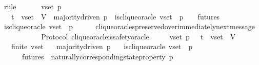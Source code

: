 \begin{isabellebody}
\ {\isacharparenleft}rule{\isacharplus}{\isacharparenright}\isanewline
{}\isamarkupfalse%
\ {\isacharminus}\isanewline
\ \ \isamarkupfalse%
\ {\isasymsigma}\ v{\isacharunderscore}set\ p\ {\isasymsigma}{\isacharprime}\isanewline
\ \ \isamarkupfalse%
\ {\isachardoublequoteopen}{\isasymsigma}\ {\isasymin}\ {\isasymSigma}t\ {\isasymand}\ v{\isacharunderscore}set\ {\isasymsubseteq}\ V{\isachardoublequoteclose}\ \ {\isachardoublequoteopen}majority{\isacharunderscore}driven\ p{\isachardoublequoteclose}\ \ {\isachardoublequoteopen}is{\isacharunderscore}clique{\isacharunderscore}oracle\ {\isacharparenleft}v{\isacharunderscore}set{\isacharcomma}\ {\isasymsigma}{\isacharcomma}\ p{\isacharparenright}{\isachardoublequoteclose}\ \ {\isachardoublequoteopen}{\isasymsigma}{\isacharprime}\ {\isasymin}\ futures\ {\isasymsigma}{\isachardoublequoteclose}\ \isanewline
\ \ \isamarkupfalse%
\ {\isachardoublequoteopen}is{\isacharunderscore}clique{\isacharunderscore}oracle\ {\isacharparenleft}v{\isacharunderscore}set{\isacharcomma}\ {\isasymsigma}{\isacharprime}{\isacharcomma}\ p{\isacharparenright}{\isachardoublequoteclose}\isanewline
\ \ \ \ \isamarkupfalse%
\ clique{\isacharunderscore}oracles{\isacharunderscore}preserved{\isacharunderscore}over{\isacharunderscore}immediately{\isacharunderscore}next{\isacharunderscore}message\isanewline
\ \ \ \ \isanewline
\ \ \ \ \isamarkupfalse%
\isanewline
{}\isamarkupfalse%
%
\endisatagproof
{\isafoldproof}%
%
\isadelimproof
\isanewline
%
\endisadelimproof
\isanewline
\isanewline
{}\isamarkupfalse%
\ {\isacharparenleft}\ Protocol{\isacharparenright}\ clique{\isacharunderscore}oracle{\isacharunderscore}is{\isacharunderscore}safety{\isacharunderscore}oracle\ {\isacharcolon}\isanewline
\ \ {\isachardoublequoteopen}{\isasymforall}\ {\isasymsigma}\ v{\isacharunderscore}set\ p{\isachardot}\ {\isasymsigma}\ {\isasymin}\ {\isasymSigma}t\ {\isasymand}\ v{\isacharunderscore}set\ {\isasymsubseteq}\ V\ \isanewline
\ \ {\isasymlongrightarrow}\ finite\ v{\isacharunderscore}set\isanewline
\ \ {\isasymlongrightarrow}\ majority{\isacharunderscore}driven\ p\isanewline
\ \ {\isasymlongrightarrow}\ is{\isacharunderscore}clique{\isacharunderscore}oracle\ {\isacharparenleft}v{\isacharunderscore}set{\isacharcomma}\ {\isasymsigma}{\isacharcomma}\ p{\isacharparenright}\ \isanewline
\ \ {\isasymlongrightarrow}\ {\isacharparenleft}{\isasymforall}\ {\isasymsigma}{\isacharprime}\ {\isasymin}\ futures\ {\isasymsigma}{\isachardot}\ naturally{\isacharunderscore}corresponding{\isacharunderscore}state{\isacharunderscore}property\ p\ {\isasymsigma}{\isacharprime}{\isacharparenright}{\isachardoublequoteclose}\ \ \ \ \isanewline

\end{isabellebody}
